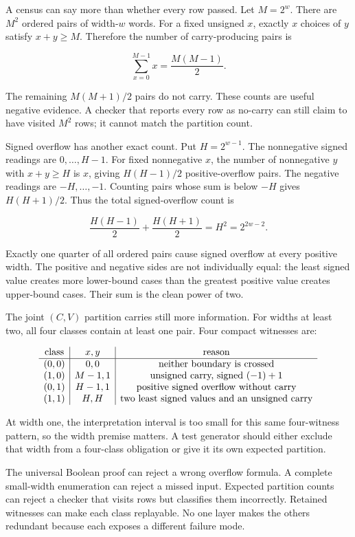 A census can say more than whether every row passed. Let
\(M=2^w\). There are \(M^2\) ordered pairs of width-\(w\) words. For a fixed
unsigned \(x\), exactly \(x\) choices of \(y\) satisfy \(x+y\geq M\).
Therefore the number of carry-producing pairs is

\[
  \sum_{x=0}^{M-1}x=\frac{M(M-1)}{2}.
\]

The remaining \(M(M+1)/2\) pairs do not carry. These counts are useful
negative evidence. A checker that reports every row as no-carry can still
claim to have visited \(M^2\) rows; it cannot match the partition count.

Signed overflow has another exact count. Put \(H=2^{w-1}\). The nonnegative
signed readings are \(0,\ldots,H-1\). For fixed nonnegative \(x\), the number
of nonnegative \(y\) with \(x+y\geq H\) is \(x\), giving
\(H(H-1)/2\) positive-overflow pairs. The negative readings are
\(-H,\ldots,-1\). Counting pairs whose sum is below \(-H\) gives
\(H(H+1)/2\). Thus the total signed-overflow count is

\[
  \frac{H(H-1)}{2}+\frac{H(H+1)}{2}=H^2=2^{2w-2}.
\]

Exactly one quarter of all ordered pairs cause signed overflow at every
positive width. The positive and negative sides are not individually equal:
the least signed value creates more lower-bound cases than the greatest
positive value creates upper-bound cases. Their sum is the clean power of two.

The joint \((C,V)\) partition carries still more information. For widths at
least two, all four classes contain at least one pair. Four compact witnesses are:

\[
\begin{array}{c|c|c}
\hbox{class} & x,y & \hbox{reason}\\ \hline
(0,0) & 0,0 & \hbox{neither boundary is crossed}\\
(1,0) & M-1,1 & \hbox{unsigned carry, signed }(-1)+1\\
(0,1) & H-1,1 & \hbox{positive signed overflow without carry}\\
(1,1) & H,H & \hbox{two least signed values and an unsigned carry}
\end{array}
\]

At width one, the interpretation interval is too small for this same
four-witness pattern, so the width premise matters. A test generator should
either exclude that width from a four-class obligation or give it its own
expected partition.

\begin{proofkit}[title={Counts, witnesses, and formulas test different failures}]
The universal Boolean proof can reject a wrong overflow formula. A complete
small-width enumeration can reject a missed input. Expected partition counts
can reject a checker that visits rows but classifies them incorrectly. Retained
witnesses can make each class replayable. No one layer makes the others
redundant because each exposes a different failure mode.
\end{proofkit}

